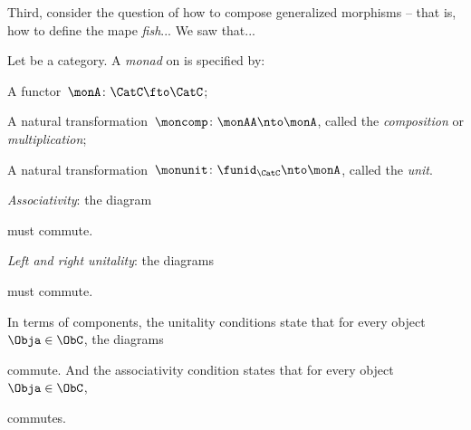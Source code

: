 Third, consider the question of how to compose generalized morphisms -- that is, how to define the mape \emph{fish}... We saw that... 

\begin{ctdefinition}[Monad]
  \label{def:monad}
  Let \CatC be a category. A \emph{monad} on \CatC is specified by:\\
  \constit
  \begin{compactenum}
    \item A functor~$ \monA \colon \CatC \fto \CatC$;
    \item A natural transformation~$\moncomp \colon \monAA \nto \monA$, called the \emph{composition} or \emph{multiplication};
    \item A natural transformation~$\monunit \colon \funid_\CatC \nto \monA$, called the \emph{unit}.
  \end{compactenum}
  \condit
  \begin{compactenum}
    \item \emph{Associativity}: the diagram
  \begin{center}\label{eq:monad-associativity}
  \end{center}
  must commute.
 \item \emph{Left and right unitality}: the diagrams
  \begin{center}\label{eq:monad-unitality}
  \end{center}
  must commute. 
  \end{compactenum}
\end{ctdefinition}

\begin{remark}\label{rem:monad-condition-components}
In terms of components, the unitality conditions state that for every object~$\Obja \in \ObC$, the diagrams

\begin{center}
\end{center}


commute. And the associativity condition states that for every object~$\Obja \in \ObC$,

\begin{center}
\end{center}

commutes. 
\end{remark}


